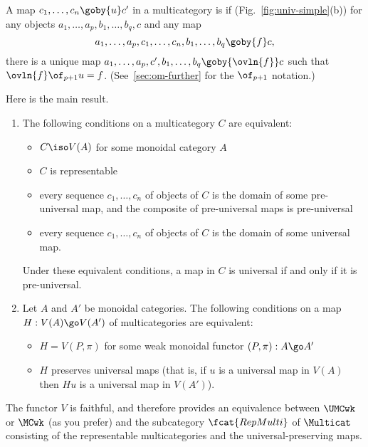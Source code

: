 %
\begin{defn}	
A map $c_1, \ldots, c_n \goby{u} c'$ in a multicategory is 
%
%
%
if (Fig.~\ref{fig:univ-simple}(b)) for any objects
$a_1, \ldots, a_p, b_1, \ldots, b_q, c$ and any map 
\[
a_1, \ldots, a_p, c_1, \ldots, c_n, b_1, \ldots, b_q \goby{f} c,
\]
there is a unique map $a_1, \ldots, a_p, c', b_1, \ldots, b_q
\goby{\ovln{f}} c$ such that $\ovln{f} \of_{p+1} u = f$.
(See~\ref{sec:om-further} for the $\of_{p+1}$ notation.)
\end{defn}

Here is the main result.
%
\begin{thm}	
\begin{enumerate}
\item	{}
The following conditions on a multicategory $C$ are equivalent:
%
\begin{itemize}
\item $C \iso V(A)$ for some monoidal category $A$
\item $C$ is representable
\item every sequence $c_1, \ldots, c_n$ of objects of $C$ is the domain of
some pre-universal map, and the composite of pre-universal maps is
pre-universal 
\item every sequence $c_1, \ldots, c_n$ of objects of $C$ is the domain of
some universal map.
\end{itemize}
Under these equivalent conditions, a map in $C$ is universal if and only if
it is pre-universal.
%
\item	{}
Let $A$ and $A'$ be monoidal categories.  The following conditions on
a map $H: V(A) \go V(A')$ of multicategories are equivalent:
%
\begin{itemize}
\item $H = V(P, \pi)$ for some weak monoidal functor $(P, \pi): A \go A'$
\item $H$ preserves%
%
%
universal maps (that is, if $u$ is a universal
map in $V(A)$ then $Hu$ is a universal map in $V(A')$).
\end{itemize}
\end{enumerate}
\end{thm}
%
The functor $V$ is faithful, and therefore provides an equivalence between
$\UMCwk$ or $\MCwk$ (as you prefer) and the subcategory $\fcat{RepMulti}$
of $\Multicat$ consisting of the representable multicategories and the
universal-preserving maps.


